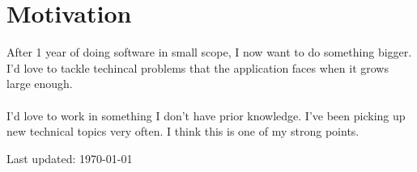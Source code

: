 \documentclass[letterpaper]{article}
\begin{document}
\section*{Motivation}
After 1 year of doing software in small scope, I now want to do something bigger. I'd love to tackle techincal problems that the application faces when it grows large enough.
\\
\\
I'd love to work in something I don't have prior knowledge. I've been picking up new technical topics very often. I think this is one of my strong points.
\bigskip

\begin{center}
  \begin{footnotesize}
    Last updated: \today \\
  \end{footnotesize}
\end{center}
\end{document}
